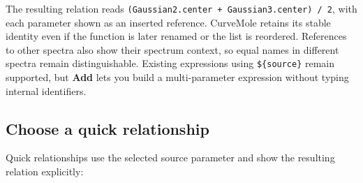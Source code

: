 \documentclass[
  10pt,
  a4paper,
  oneside]{scrreprt}
\begin{document}
The resulting relation reads
\texttt{(Gaussian2.center\ +\ Gaussian3.center)\ /\ 2}, with each
parameter shown as an inserted reference. CurveMole retains its stable
identity even if the function is later renamed or the list is reordered.
References to other spectra also show their spectrum context, so equal
names in different spectra remain distinguishable. Existing expressions
using \texttt{\$\{source\}} remain supported, but \textbf{Add} lets you
build a multi-parameter expression without typing internal identifiers.

\hypertarget{choose-a-quick-relationship}{%
\subsection{Choose a quick
relationship}\label{choose-a-quick-relationship}}

Quick relationships use the selected source parameter and show the
resulting relation explicitly:
\end{document}
